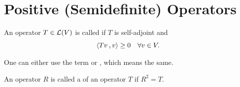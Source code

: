 \section{Positive (Semidefinite) Operators}

\begin{mydef}
  An operator $T \in \mathcal{L} (V)$ is called  if $T$ is self-adjoint and
  \[
  \ip{Tv}{v} \geq 0 \quad \forall v \in V.
  \]

  One can either use the term  or , which means the same.
\end{mydef}

\begin{mydef}
  An operator $R$ is called a  of an operator $T$ if $R^2=T$.
\end{mydef}


